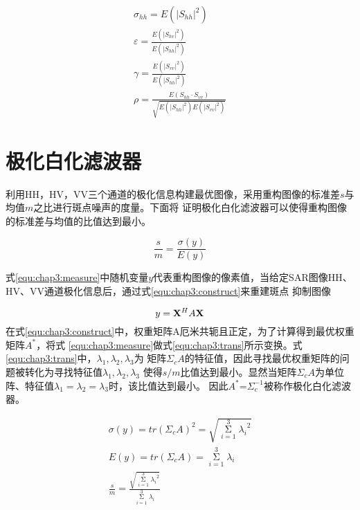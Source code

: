     \begin{equation}
        \label{equ:chap3:covdef}
        \begin{array}{l}
        {\sigma _{hh}} = E({\left| {S_{hh}} \right|^2})\\
        \varepsilon  = \frac{{E({{\left| {S_{hv}} \right|}^2})}}{{E({{\left| {S_{hh}} \right|}^2})}}\\
        \gamma  = \frac{{E({{\left| {S_{vv}} \right|}^2})}}{{E({{\left| {S_{hh}} \right|}^2})}}\\
        \rho  = \frac{{E(S_{hh} \cdot S_{vv})}}{{\sqrt {E({{\left| {S_{hh}} \right|}^2})E({{\left| {S_{vv}} \right|}^2})} }}
        \end{array}
    \end{equation}

\section{极化白化滤波器}
    利用HH，HV，VV三个通道的极化信息构建最优图像，采用重构图像的标准差$s$与均值$m$之比进行斑点噪声的度量。下面将
    证明极化白化滤波器可以使得重构图像的标准差与均值的比值达到最小。

    \begin{equation}
        \label{equ:chap3:measure}
        \frac{s}{m} = \frac{{\sigma (y)}}{{E(y)}}
    \end{equation}

    式\ref{equ:chap3:measure}中随机变量$y$代表重构图像的像素值，当给定SAR图像HH、HV、VV通道极化信息后，通过式\ref{equ:chap3:construct}来重建斑点
    抑制图像

    \begin{equation}
        \label{equ:chap3:construct}
        y = {{\bf{X}}^H}A{\bf{X}}
    \end{equation}
    在式\ref{equ:chap3:construct}中，权重矩阵A厄米共轭且正定，为了计算得到最优权重矩阵$A^*$，将式
    \ref{equ:chap3:measure}做式\ref{equ:chap3:trans}所示变换。式\ref{equ:chap3:trans}中，$\lambda_1, \lambda_2, \lambda_3$为
    矩阵${\Sigma _c}A$的特征值，因此寻找最优权重矩阵的问题被转化为寻找特征值$\lambda_1, \lambda_2, \lambda_3$
    使得$s/m$比值达到最小。显然当矩阵$\Sigma_cA$为单位阵、特征值$\lambda_1=\lambda_2=\lambda_3$时，该比值达到最小。
    因此$A^*$=$\Sigma_c^{-1}$被称作极化白化滤波器。


    \begin{equation}
        \label{equ:chap3:trans}
        \begin{array}{*{20}{c}}
            {\sigma (y) = tr{{({\Sigma _c}A)}^2} = \sqrt {\mathop \Sigma \limits_{i = 1}^3 {\lambda _i}^2} }\\
            {E(y) = tr({\Sigma _c}A) = \mathop \Sigma \limits_{i = 1}^3 {\lambda _i}}\\
            {\frac{s}{m} = \frac{{\sqrt {\mathop \Sigma \limits_{i = 1}^3 {\lambda _i}^2} }}{{\mathop \Sigma \limits_{i = 1}^3 {\lambda _i}}}}
        \end{array}
    \end{equation}

